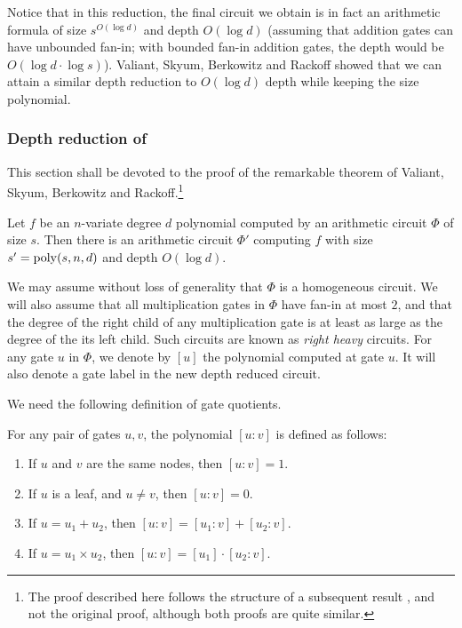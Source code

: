 Notice that in this reduction, the final circuit we obtain is in fact an arithmetic formula of size $s^{O(\log d)}$ and depth $O(\log d)$ (assuming that addition gates can have unbounded fan-in; with bounded fan-in addition gates, the depth would be $O(\log d \cdot \log s)$). 
Valiant, Skyum, Berkowitz and Rackoff \cite{vsbr83} showed that we can attain a similar depth reduction to $O(\log d)$ depth while keeping the size polynomial.


\subsubsection{Depth reduction of \cite{vsbr83}}


This section shall be devoted to the proof of the remarkable theorem of Valiant, Skyum, Berkowitz and Rackoff.\footnote{The proof described here follows the structure of a subsequent result \cite{ajmv98}, and not the original proof, although both proofs are quite similar.}


\begin{theorem}\label{thm:vsbr}
  Let $f$ be an $n$-variate degree $d$ polynomial computed by an
  arithmetic circuit $\Phi$ of size $s$. 
Then there is an arithmetic
  circuit $\Phi'$ computing $f$ with size $s' = \operatorname{poly}(s,n,d)$ and
  depth $O(\log d)$.
\end{theorem}

We may assume without loss of generality that $\Phi$ is a homogeneous
circuit. 
We will also assume that all multiplication gates in $\Phi$
have fan-in at most $2$, and that the degree of the right child of any
multiplication gate is at least as large as the degree of the its left
child. 
Such circuits are known as \emph{right heavy} circuits.
For any gate $u$ in $\Phi$, we denote by $[u]$ the polynomial computed at
gate $u$. 
It will also denote a gate label in the new depth reduced
circuit.

We need the following definition of gate quotients.

\begin{definition}\label{defn:gate-quotient}
For any pair of gates $u,v$, the polynomial $[u:v]$ is defined as follows:
\begin{enumerate}
\item If $u$ and $v$ are the same nodes, then $[u:v] = 1$. 
\item If $u$ is a leaf, and $u\neq v$, then $[u:v] = 0$. 
\item If $u = u_1 + u_2$, then $[u:v] = [u_1:v] + [u_2:v]$.
\item If $u = u_1 \times u_2$, then $[u:v] = [u_1] \cdot [u_2 : v]$. \qedhere
\end{enumerate}
\end{definition}

